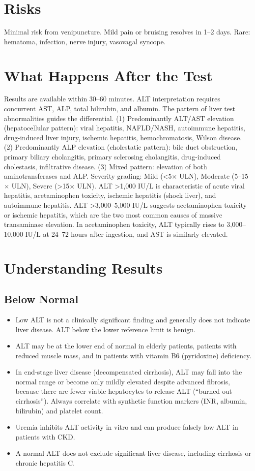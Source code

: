 \section*{Risks}
Minimal risk from venipuncture. Mild pain or bruising resolves in 1--2 days. Rare: hematoma, infection, nerve injury, vasovagal syncope.

\section*{What Happens After the Test}
Results are available within 30--60 minutes. ALT interpretation requires concurrent AST, ALP, total bilirubin, and albumin. The pattern of liver test abnormalities guides the differential. (1) Predominantly ALT/AST elevation (hepatocellular pattern): viral hepatitis, NAFLD/NASH, autoimmune hepatitis, drug-induced liver injury, ischemic hepatitis, hemochromatosis, Wilson disease. (2) Predominantly ALP elevation (cholestatic pattern): bile duct obstruction, primary biliary cholangitis, primary sclerosing cholangitis, drug-induced cholestasis, infiltrative disease. (3) Mixed pattern: elevation of both aminotransferases and ALP. Severity grading: Mild (<5$\times$ ULN), Moderate (5--15$\times$ ULN), Severe (>15$\times$ ULN). ALT >1,000 IU/L is characteristic of acute viral hepatitis, acetaminophen toxicity, ischemic hepatitis (shock liver), and autoimmune hepatitis. ALT >3,000--5,000 IU/L suggests acetaminophen toxicity or ischemic hepatitis, which are the two most common causes of massive transaminase elevation. In acetaminophen toxicity, ALT typically rises to 3,000--10,000 IU/L at 24--72 hours after ingestion, and AST is similarly elevated.

\section*{Understanding Results}

\subsection*{Below Normal}
\begin{itemize}
  \item Low ALT is not a clinically significant finding and generally does not indicate liver disease. ALT below the lower reference limit is benign.
  \item ALT may be at the lower end of normal in elderly patients, patients with reduced muscle mass, and in patients with vitamin B6 (pyridoxine) deficiency.
  \item In end-stage liver disease (decompensated cirrhosis), ALT may fall into the normal range or become only mildly elevated despite advanced fibrosis, because there are fewer viable hepatocytes to release ALT (``burned-out cirrhosis''). Always correlate with synthetic function markers (INR, albumin, bilirubin) and platelet count.
  \item Uremia inhibits ALT activity in vitro and can produce falsely low ALT in patients with CKD.
  \item A normal ALT does not exclude significant liver disease, including cirrhosis or chronic hepatitis C.
\end{itemize}

